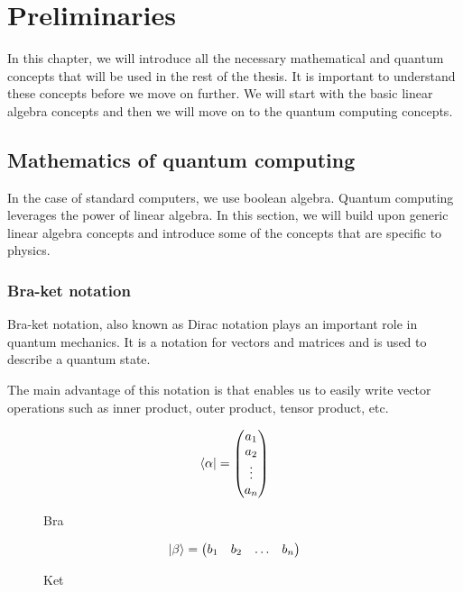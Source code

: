 \graphicspath{ {../images/}}

\chapter{Preliminaries}\label{ch:preliminaries}
In this chapter, we will introduce all the necessary mathematical and quantum concepts that will be used in the rest of the thesis. It is important to understand these concepts before we move on further. We will start with the basic linear algebra concepts and then we will move on to the quantum computing concepts.
\section{Mathematics of quantum computing}
In the case of standard computers, we use boolean algebra. Quantum computing leverages the power of linear algebra. In this section, we will build upon generic linear algebra concepts and introduce some of the concepts that are specific to physics.

\subsection{Bra-ket notation}
Bra-ket notation, also known as Dirac notation plays an important role in quantum mechanics. It is a notation for vectors and matrices and is used to describe a quantum state. 

The main advantage of this notation is that enables us to easily write vector operations such as inner product, outer product, tensor product, etc.

\begin{figure}[h!]
    \begin{minipage}[b]{.5\textwidth}
    \centering
    $$\langle\alpha\rvert = \begin{pmatrix}
        a_1 \\
        a_2 \\
        \vdots \\
        a_n
    \end{pmatrix}$$
    \caption*{Bra}
    \end{minipage}
    \hfill
    \begin{minipage}[b]{.5\textwidth}
    \centering
    $$\lvert\beta\rangle = \begin{pmatrix}
        b_1 & b_2 & \hdots & b_n
    \end{pmatrix}
    $$
    \caption*{Ket}
    \end{minipage}
\end{figure}

